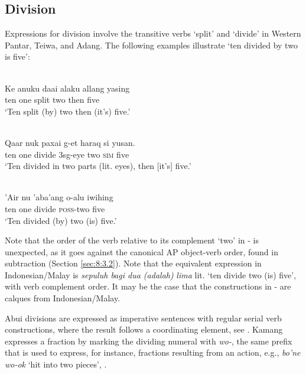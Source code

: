 \subsection{Division}
\label{sec:8:Division}
Expressions for division involve the transitive verbs `split' and `divide' in Western Pantar, Teiwa, and Adang. The following examples illustrate `ten divided by two is five': 


\ea%
\label{bkm:Ref342664493}
\\
 
\gll   Ke anuku  daai  alaku  allang  yasing\\  
    ten one  split  two  then  five \\
\glt `Ten split (by) two then (it's) five.'
\z



 

 


\ea
\label{ex:8:1246}
\\  
 \gll Qaar  nuk  paxai  g-et  haraq  si  yusan.   \\
  ten  one  divide  3sg-eye  two  \textsc{sim}  five   \\
 \glt `Ten divided in two parts (lit. eyes), then [it's] five.'
\z
 

\ea%
\label{bkm:Ref342664505}
\\
\gll  'Air nu  'aba'ang  o-alu  iwihing\\  
    ten one  divide  \textsc{poss-}two  five \\
\glt `Ten divided (by) two (is) five.'  
\z

 

 

  

Note that the order of the verb relative to its complement `two' in - is unexpected, as it goes against the canonical AP object-verb order, found in subtraction (Section \ref{sec:8:3.2}). Note that the equivalent expression in Indonesian/Malay is \textit{sepuluh bagi dua (adalah)} \textit{lima} lit. `ten divide two (is) five', with verb complement order. It may be the case that the constructions in - are calques from Indonesian/Malay. 

Abui divisions are expressed as imperative sentences with regular serial verb constructions, where the result follows a coordinating element, see . Kamang expresses a fraction by marking the dividing numeral with \textit{wo-}, the same prefix that is used to express, for instance, fractions resulting from an action, e.g., \textit{bo'ne wo-ok} `hit into two pieces', . 


